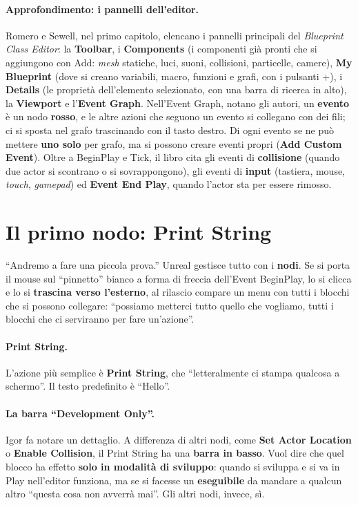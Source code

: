 \paragraph{Approfondimento: i pannelli dell'editor.} Romero e Sewell, nel primo capitolo,
elencano i pannelli principali del \emph{Blueprint Class Editor}: la
\textbf{Toolbar}, i \textbf{Components} (i componenti già pronti che si aggiungono con
Add: \emph{mesh} statiche, luci, suoni, collisioni, particelle, camere), \textbf{My
Blueprint} (dove si creano variabili, macro, funzioni e grafi, con i pulsanti +), i
\textbf{Details} (le proprietà dell'elemento selezionato, con una barra di ricerca in
alto), la \textbf{Viewport} e l'\textbf{Event Graph}. Nell'Event Graph, notano gli
autori, un \textbf{evento} è un nodo \textbf{rosso}, e le altre azioni che seguono un
evento si collegano con dei fili; ci si sposta nel grafo trascinando con il tasto
destro. Di ogni evento se ne può mettere \textbf{uno solo} per grafo, ma si possono
creare eventi propri (\textbf{Add Custom Event}). Oltre a BeginPlay e Tick, il libro
cita gli eventi di \textbf{collisione} (quando due actor si scontrano o si
sovrappongono), gli eventi di \textbf{input} (tastiera, mouse, \emph{touch},
\emph{gamepad}) ed \textbf{Event End Play}, quando l'actor sta per essere rimosso.

\section{Il primo nodo: Print String}
\label{ue2:sec:print}

``Andremo a fare una piccola prova.'' Unreal gestisce tutto con i \textbf{nodi}. Se si
porta il mouse sul ``pinnetto'' bianco a forma di freccia dell'Event BeginPlay, lo si
clicca e lo si \textbf{trascina verso l'esterno}, al rilascio compare un menu con tutti
i blocchi che si possono collegare: ``possiamo metterci tutto quello che vogliamo, tutti
i blocchi che ci serviranno per fare un'azione''.

\paragraph{Print String.} L'azione più semplice è \textbf{Print String}, che
``letteralmente ci stampa qualcosa a schermo''. Il testo predefinito è ``Hello''.

\paragraph{La barra ``Development Only''.} Igor fa notare un dettaglio. A differenza di
altri nodi, come \textbf{Set Actor Location} o \textbf{Enable Collision}, il Print String
ha una \textbf{barra in basso}. Vuol dire che quel blocco ha effetto \textbf{solo in
modalità di sviluppo}: quando si sviluppa e si va in Play nell'editor funziona, ma se si
facesse un \textbf{eseguibile} da mandare a qualcun altro ``questa cosa non avverrà
mai''. Gli altri nodi, invece, sì.

